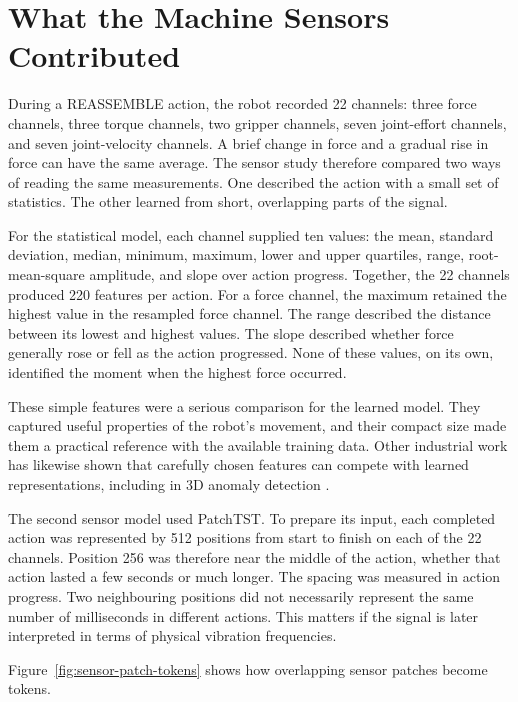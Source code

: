 
\section{What the Machine Sensors Contributed}

During a REASSEMBLE action, the robot recorded 22 channels: three force channels, three
torque channels, two gripper channels, seven joint-effort channels, and seven
joint-velocity channels. A brief change in force and a gradual rise in force can have
the same average. The sensor study therefore compared two ways of reading the same
measurements. One described the action with a small set of statistics. The other learned
from short, overlapping parts of the signal.

For the statistical model, each channel supplied ten values: the mean, standard
deviation, median, minimum, maximum, lower and upper quartiles, range, root-mean-square
amplitude, and slope over action progress. Together, the 22 channels produced
220 features per action. For a force channel, the maximum retained the highest
value in the resampled force channel. The range described the distance between its
lowest and highest values. The slope described whether force generally rose or fell as
the action progressed. None of these values, on its own, identified the moment when the
highest force occurred.

These simple features were a serious comparison for the learned model. They captured
useful properties of the robot's movement, and their compact size made them a practical
reference with the available training data. Other industrial work has likewise shown
that carefully chosen features can compete with learned representations, including in 3D
anomaly detection \parencite{Horwitz2023Back}.

The second sensor model used PatchTST. To prepare its input, each completed action was
represented by 512 positions from start to finish on each of the 22 channels. Position
256 was therefore near the middle of the action, whether that action lasted a few
seconds or much longer. The spacing was measured in action progress. Two
neighbouring positions did not necessarily represent the same number of milliseconds in
different actions. This matters if the signal is later interpreted in terms of physical
vibration frequencies.

Figure~\ref{fig:sensor-patch-tokens} shows how overlapping sensor patches become tokens.

